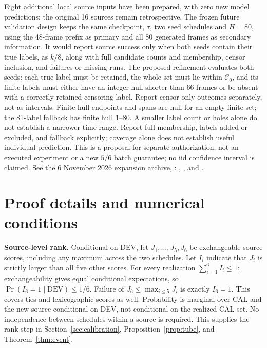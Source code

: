 \documentclass[11pt]{article}
\theoremstyle{noteplain}
\begin{document}
Eight additional local source inputs have been prepared, with zero new model predictions; the original 16 sources remain retrospective. The frozen future validation design keeps the same checkpoint, $\tau$, two seed schedules and $H=80$, using the 48-frame prefix as primary and all 80 generated frames as secondary information. It would report source success only when both seeds contain their true labels, as $k/8$, along with full candidate counts and membership, censor inclusion, and failures or missing runs. The proposed refinement evaluates both seeds: each true label must be retained, the whole set must lie within $\mathcal C_0$, and its finite labels must either have an integer hull shorter than 66 frames or be absent with a correctly retained censoring label. Report censor-only outcomes separately, not as intervals. Finite hull endpoints and spans are null for an empty finite set; the 81-label fallback has finite hull 1--80. A smaller label count or holes alone do not establish a narrower time range. Report full membership, labels added or excluded, and fallback explicitly; coverage alone does not establish useful individual prediction. This is a proposal for separate authorization, not an executed experiment or a new $5/6$ batch guarantee; no iid confidence interval is claimed. See the 6 November 2026 expansion archive, \allowbreak{}: , , and .

\newpage
\appendix
\section{Proof details and numerical conditions}\label{app:details}
\textbf{Source-level rank.} Conditional on DEV, let $J_1,\ldots,J_5,J_6$ be exchangeable source scores, including any maximum across the two schedules. Let $I_i$ indicate that $J_i$ is strictly larger than all five other scores. For every realization $\sum_{i=1}^6 I_i\le1$; exchangeability gives equal conditional expectations, so $\Pr(I_6=1\mid\mathrm{DEV})\le1/6$. Failure of $J_6\le\max_{i\le5}J_i$ is exactly $I_6=1$. This covers ties and lexicographic scores as well. Probability is marginal over CAL and the new source conditional on DEV, not conditional on the realized CAL set. No independence between schedules within a source is required. This supplies the rank step in Section~\ref{sec:calibration}, Proposition~\ref{prop:tube}, and Theorem~\ref{thm:event}.
\end{document}
